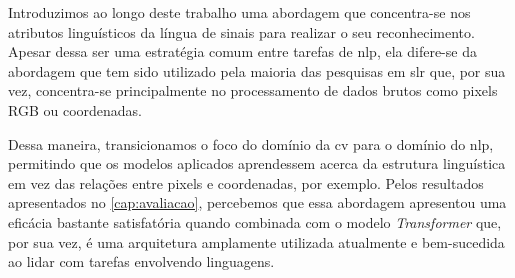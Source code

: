 Introduzimos ao longo deste trabalho uma abordagem que concentra-se nos atributos linguísticos da língua de sinais para realizar o seu reconhecimento.
Apesar dessa ser uma estratégia comum entre tarefas de \acrfull{nlp}, ela difere-se da abordagem que tem sido utilizado pela maioria das pesquisas em \acrfull{slr} que, por sua vez, concentra-se principalmente no processamento de dados brutos como pixels RGB ou coordenadas.


Dessa maneira, transicionamos o foco do domínio da \acrfull{cv} para o domínio do \acrshort{nlp}, permitindo que os modelos aplicados aprendessem acerca da estrutura linguística em vez das relações entre pixels e coordenadas, por exemplo.
Pelos resultados apresentados no \autoref{cap:avaliacao}, percebemos que essa abordagem apresentou uma eficácia bastante satisfatória quando combinada com o modelo \textit{Transformer} que, por sua vez, é uma arquitetura amplamente utilizada atualmente e bem-sucedida ao lidar com tarefas envolvendo linguagens.


